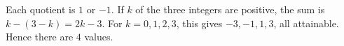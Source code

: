Each quotient is $1$ or $-1$. If $k$ of the three integers are positive, the sum is $k-(3-k)=2k-3$. For $k=0,1,2,3$, this gives $-3,-1,1,3$, all attainable. Hence there are $\boxed{4}$ values.
